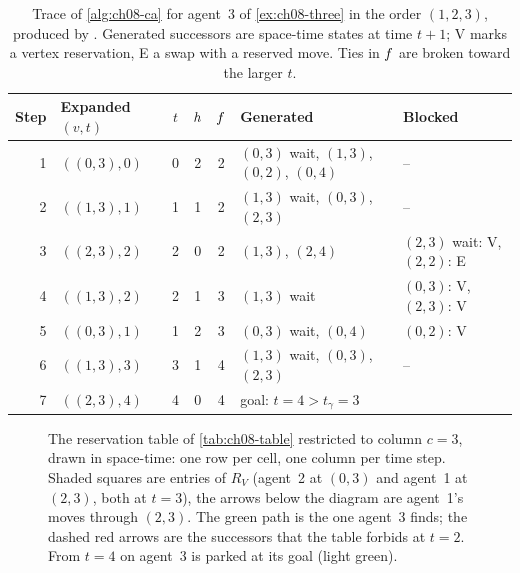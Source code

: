 \begin{table}[tb]
  \centering\footnotesize
  \caption{Trace of \cref{alg:ch08-ca} for agent~3 of \cref{ex:ch08-three} in the order
  $(1,2,3)$, produced by . Generated successors are
  space-time states at time $t+1$; V marks a vertex reservation, E a swap with a
  reserved move. Ties in $f$ are broken toward the larger $t$.}
  \label{tab:ch08-trace}
  \begin{tabular}{@{}rlcccll@{}}
  \toprule
  Step & Expanded $(v, t)$ & $t$ & $h$ & $f$ & Generated & Blocked \\
  \midrule
  1 & $((0,3), 0)$ & 0 & 2 & 2 & $(0,3)$ wait, $(1,3)$, $(0,2)$, $(0,4)$ & -- \\
  2 & $((1,3), 1)$ & 1 & 1 & 2 & $(1,3)$ wait, $(0,3)$, $(2,3)$ & -- \\
  3 & $((2,3), 2)$ & 2 & 0 & 2 & $(1,3)$, $(2,4)$ & $(2,3)$ wait: V, $(2,2)$: E \\
  4 & $((1,3), 2)$ & 2 & 1 & 3 & $(1,3)$ wait & $(0,3)$: V, $(2,3)$: V \\
  5 & $((0,3), 1)$ & 1 & 2 & 3 & $(0,3)$ wait, $(0,4)$ & $(0,2)$: V \\
  6 & $((1,3), 3)$ & 3 & 1 & 4 & $(1,3)$ wait, $(0,3)$, $(2,3)$ & -- \\
  7 & $((2,3), 4)$ & 4 & 0 & 4 & goal: $t = 4 > t_\gamma = 3$ & \\
  \bottomrule
  \end{tabular}
\end{table}

\begin{figure}[tb]
  \centering
  \caption{The reservation table of \cref{tab:ch08-table} restricted to column $c = 3$,
  drawn in space-time: one row per cell, one column per time step. Shaded squares are
  entries of $R_V$ (agent~2 at $(0,3)$ and agent~1 at $(2,3)$, both at $t = 3$), the
  arrows below the diagram are agent~1's moves through $(2,3)$. The green path is the
  one agent~3 finds; the dashed red arrows are the successors that the table forbids at
  $t = 2$. From $t = 4$ on agent~3 is parked at its goal (light green).}
  \label{fig:ch08-spacetime}
\end{figure}

